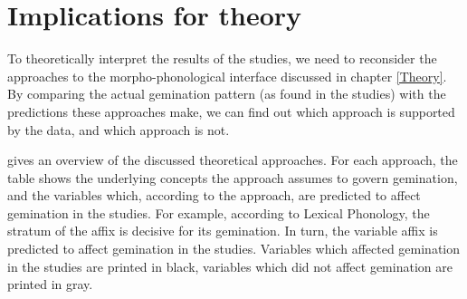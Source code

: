\section{Implications for theory}


To theoretically interpret the results of the studies, we need to reconsider the approaches to the morpho-phonological interface discussed in chapter \ref{Theory}.   By comparing the actual gemination pattern (as found in the studies) with the predictions these approaches make, we can find out which approach is supported by the data, and which approach is not.



 gives an overview of the discussed theoretical approaches. For each approach, the table shows the underlying concepts the approach assumes to govern gemination, and the variables which, according to the approach, are predicted to affect gemination in the studies. For example, according to Lexical Phonology, the stratum of the affix is decisive for its gemination. In turn, the variable affix is predicted to affect gemination in the studies. 
Variables which affected gemination in the studies are printed in black, variables which did not affect gemination are printed in gray.






